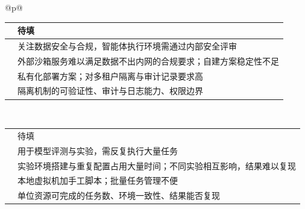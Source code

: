 \begin{longtable}{@{}p{\linewidth}@{}}
\begin{minipage}{\linewidth}
\begin{tabular}{@{}>{\raggedright\arraybackslash}p{}>{\raggedright\arraybackslash}p{}@{}}
\rowcolor{white} \TableHeaderText{访谈时间与方式} & 待填 \\ \hline
\rowcolor{white} \TableHeaderText{当前部署与使用情况} & 关注数据安全与合规，智能体执行环境需通过内部安全评审 \\ \hline
\rowcolor{white} \TableHeaderText{核心痛点} & 外部沙箱服务难以满足数据不出内网的合规要求；自建方案稳定性不足 \\ \hline
\rowcolor{white} \TableHeaderText{现有方案与不足} & 私有化部署方案；对多租户隔离与审计记录要求高 \\ \hline
\rowcolor{white} \TableHeaderText{采购关注点} & 隔离机制的可验证性、审计与日志能力、权限边界 \\ \hline
\end{tabular}
\end{minipage} \\[6pt]
\begin{minipage}{\linewidth}
\begin{tabular}{@{}>{\raggedright\arraybackslash}p{}>{\raggedright\arraybackslash}p{}@{}}
\hline
\rowcolor{WordTableHeader}\multicolumn{2}{@{}p{\linewidth}@{}}{\RecordHeading{编号：I-05\quad 受访角色与企业类型：高校实验室 · 课题负责人}} \\ \hline
\rowcolor{white} \TableHeaderText{访谈时间与方式} & 待填 \\ \hline
\rowcolor{white} \TableHeaderText{当前部署与使用情况} & 用于模型评测与实验，需反复执行大量任务 \\ \hline
\rowcolor{white} \TableHeaderText{核心痛点} & 实验环境搭建与重复配置占用大量时间；不同实验相互影响，结果难以复现 \\ \hline
\rowcolor{white} \TableHeaderText{现有方案与不足} & 本地虚拟机加手工脚本；批量任务管理不便 \\ \hline
\rowcolor{white} \TableHeaderText{采购关注点} & 单位资源可完成的任务数、环境一致性、结果能否复现 \\ \hline
\end{tabular}
\end{minipage} \\[6pt]
\begin{minipage}{\linewidth}
\begin{tabular}{@{}>{\raggedright\arraybackslash}p{}>{\raggedright\arraybackslash}p{}@{}}
\hline
\rowcolor{WordTableHeader}\multicolumn{2}{@{}p{\linewidth}@{}}{\RecordHeading{编号：I-06\quad 受访角色与企业类型：研究所 · 科研平台管理人员}} \\ \hline

\end{tabular}
\end{minipage}
\end{longtable}
